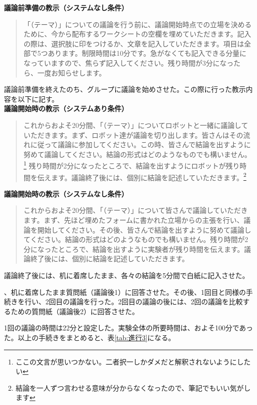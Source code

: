 \documentclass[11pt, a4paper]{jreport} %
\begin{document}
\textbf{議論前準備の教示（システムなし条件）}
\begin{quote}
「（テーマ）」についての議論を行う前に、議論開始時点での立場を決めるために、今から配布するワークシートの空欄を埋めていただきます。記入の際は、選択肢に印をつけるか、文章を記入していただきます。項目は全部で5つあります。制限時間は10分です。急がなくても記入できる分量になっていますので、焦らず記入してください。残り時間が3分になったら、一度お知らせします。
\end{quote}


議論前準備を終えたのち、グループに議論を始めさせた。この際に行った教示内容を以下に記す。\\
\textbf{議論開始時の教示（システムあり条件）}
\begin{quote}
これからおよそ20分間、「（テーマ）」についてロボットと一緒に議論していただきます。まず、ロボット達が議論を切り出します。皆さんはその流れに従って議論に参加してください。この時、皆さんで結論を出すように努めて議論してください。結論の形式はどのようなものでも構いません。\footnote{ここの文言が思いつかない。二者択一しかダメだと解釈されないようにしたい}
残り時間が2分になったところで、結論を出すようにロボットが残り時間を伝えます。議論終了後には、個別に結論を記述していただきます。\footnote{結論を一人ずつ言わせる意味が分からなくなったので、筆記でもいい気がします}%
\end{quote}

\textbf{議論開始時の教示（システムなし条件）}
\begin{quote}
これからおよそ20分間、「（テーマ）」について皆さんで議論していただきます。まず、先ほど埋めたフォームに書かれた立場からの主張を行い、議論を開始してください。その後、皆さんで結論を出すように努めて議論してください。結論の形式はどのようなものでも構いません。残り時間が2分になったところで、結論を出すように実験者が残り時間を伝えます。議論終了後には、個別に結論を記述していただきます。%
\end{quote}



議論終了後には、机に着席したまま、各々の結論を5分間で白紙に記入させた。

、机に着席したまま質問紙（議論後1）に回答させた。その後、1回目と同様の手続きを行い、2回目の議論を行った。2回目の議論の後には、2回の議論を比較するための質問紙（議論後2）に回答させた。


1回の議論の時間は22分と設定した。実験全体の所要時間は、およそ100分であった。以上の手続きをまとめると、表\ref{tab:進行3}になる。
\end{document}
